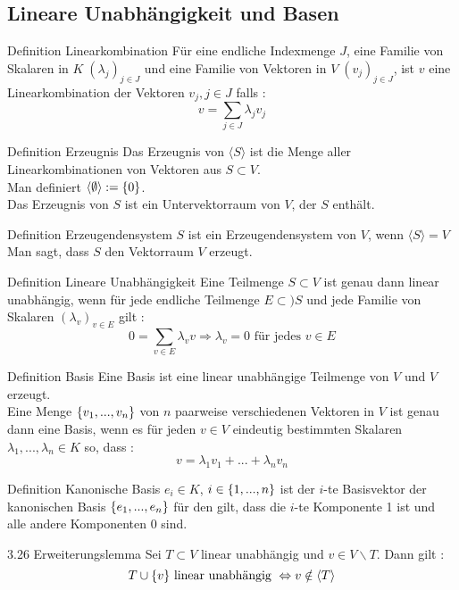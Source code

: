 \documentclass[main.tex]{subfiles}
\begin{document}
\subsection*{Lineare Unabhängigkeit und Basen}
\begin{karte}{Definition Linearkombination}
    Für eine endliche Indexmenge \(J\), eine Familie von Skalaren in 
    \(K \;(\lambda_j)_{j \in J}\) und eine Familie von Vektoren in 
    \(V \; (v_j)_{j \in J}\), ist \(v\) eine Linearkombination der 
    Vektoren \(v_j, j \in J\) falls : 
    \[v = \sum_{j \in J} \lambda_j v_j \]
\end{karte}
\begin{karte}{Definition Erzeugnis}
    Das Erzeugnis von \(\langle S \rangle \) ist die Menge 
    aller Linearkombinationen von Vektoren aus \(S \subset V\). \\
    Man definiert \(\langle \emptyset \rangle : = \{0\}\). \\
    Das Erzeugnis von \(S\) ist ein Untervektorraum von \(V\), 
    der \(S\) enthält.
\end{karte}
\begin{karte}{Definition Erzeugendensystem}
    \(S\) ist ein Erzeugendensystem von \(V\), wenn \(\langle S \rangle = V\)\\
    Man sagt, dass \(S\) den Vektorraum \(V\) erzeugt.
\end{karte}
\begin{karte}{Definition Lineare Unabhängigkeit}
    Eine Teilmenge \(S \subset V\) ist genau dann linear unabhängig,
    wenn für jede endliche Teilmenge \(E \subset) S\) 
    und jede Familie von Skalaren \( (\lambda_v)_{v \in E}\) gilt : 
    \[0 = \sum_{v \in E} \lambda_v v \Rightarrow \lambda_v = 0 
    \text{ für jedes } v \in E\]
\end{karte}
\begin{karte}{Definition Basis}
    Eine Basis ist eine linear unabhängige Teilmenge von \(V\) und 
    \(V\) erzeugt. \\
    Eine Menge \(\{v_1, ... ,v_n\}\) von \(n\) paarweise verschiedenen 
    Vektoren in \(V\) ist genau dann eine Basis, wenn es für jeden \(v \in V\)
    eindeutig bestimmten Skalaren \(\lambda_1, ... , \lambda_n \in K\)
    so, dass : 
    \[v = \lambda_1 v_1 + ... + \lambda_n v_n\]
\end{karte}
\begin{karte}{Definition Kanonische Basis}
    \(e_i \in K\), \(i \in \{1, ... , n\}\) ist der \(i\)-te Basisvektor
    der kanonischen Basis \(\{e_1, ... ,e_n\}\) für den gilt, dass die 
    \(i\)-te Komponente 1 ist und alle andere Komponenten \(0\) sind.
\end{karte}
\begin{karte}{3.26 Erweiterungslemma}
    Sei \(T \subset V\) linear unabhängig und \(v \in V \backslash T \). Dann gilt : 
    \[T \cup \{v\} \text{ linear unabhängig } 
    \Leftrightarrow v \notin \langle T \rangle \]

\end{karte}
\end{document}
